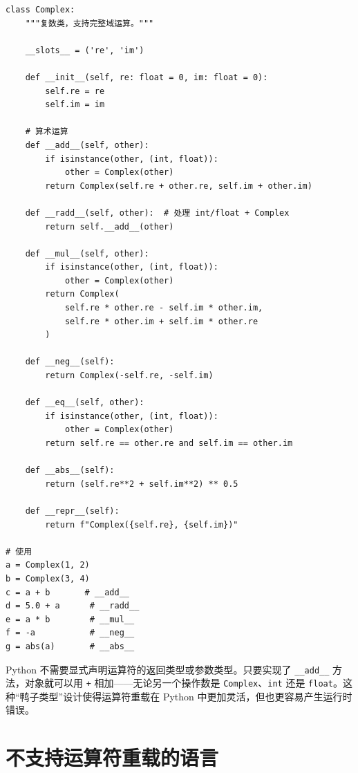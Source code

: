 \documentclass[12pt,a4paper,fontset=fandol]{ctexbook}
\newcommand{\Tp}[1]{\texttt{#1}}
\begin{document}
\begin{lstlisting}[language=Py]
class Complex:
    """复数类，支持完整域运算。"""

    __slots__ = ('re', 'im')

    def __init__(self, re: float = 0, im: float = 0):
        self.re = re
        self.im = im

    # 算术运算
    def __add__(self, other):
        if isinstance(other, (int, float)):
            other = Complex(other)
        return Complex(self.re + other.re, self.im + other.im)

    def __radd__(self, other):  # 处理 int/float + Complex
        return self.__add__(other)

    def __mul__(self, other):
        if isinstance(other, (int, float)):
            other = Complex(other)
        return Complex(
            self.re * other.re - self.im * other.im,
            self.re * other.im + self.im * other.re
        )

    def __neg__(self):
        return Complex(-self.re, -self.im)

    def __eq__(self, other):
        if isinstance(other, (int, float)):
            other = Complex(other)
        return self.re == other.re and self.im == other.im

    def __abs__(self):
        return (self.re**2 + self.im**2) ** 0.5

    def __repr__(self):
        return f"Complex({self.re}, {self.im})"

# 使用
a = Complex(1, 2)
b = Complex(3, 4)
c = a + b       # __add__
d = 5.0 + a      # __radd__
e = a * b        # __mul__
f = -a           # __neg__
g = abs(a)       # __abs__
\end{lstlisting}

\begin{note}[title=Python 的 ``鸭子类型'' 优势]
Python 不需要显式声明运算符的返回类型或参数类型。只要实现了 \texttt{\_\_add\_\_} 方法，对象就可以用 \texttt{+} 相加——无论另一个操作数是 \Tp{Complex}、\Tp{int} 还是 \Tp{float}。这种``鸭子类型''设计使得运算符重载在 Python 中更加灵活，但也更容易产生运行时错误。
\end{note}

\chapter{不支持运算符重载的语言}
\end{document}
